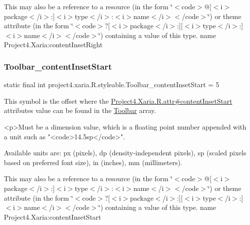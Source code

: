 This may also be a reference to a resource (in the form \char`\"{}$<$code$>$@\mbox{[}$<$i$>$package$<$/i$>$\+:\mbox{]}$<$i$>$type$<$/i$>$\+:$<$i$>$name$<$/i$>$$<$/code$>$\char`\"{}) or theme attribute (in the form \char`\"{}$<$code$>$?\mbox{[}$<$i$>$package$<$/i$>$\+:\mbox{]}\mbox{[}$<$i$>$type$<$/i$>$\+:\mbox{]}$<$i$>$name$<$/i$>$$<$/code$>$\char`\"{}) containing a value of this type.  name Project4.\+Xaria\+:content\+Inset\+Right \mbox{\label{classproject4_1_1xaria_1_1R_1_1styleable_a9834196c2626e358f21cf55efd25f27c}} 
\subsubsection{\texorpdfstring{Toolbar\+\_\+content\+Inset\+Start}{Toolbar\_contentInsetStart}}
{\footnotesize\ttfamily static final int project4.\+xaria.\+R.\+styleable.\+Toolbar\+\_\+content\+Inset\+Start = 5\hspace{0.3cm}{\ttfamily [static]}}

This symbol is the offset where the \hyperlink{}{Project4.\+Xaria.\+R.\+attr\#content\+Inset\+Start} attribute\textquotesingle{}s value can be found in the \hyperlink{classproject4_1_1xaria_1_1R_1_1styleable_af6c30f9e9e086f6bf4e510669443fa59}{Toolbar} array.

\begin{DoxyVerb}      <p>Must be a dimension value, which is a floating point number appended with a unit such as "<code>14.5sp</code>".
\end{DoxyVerb}
 Available units are\+: px (pixels), dp (density-\/independent pixels), sp (scaled pixels based on preferred font size), in (inches), mm (millimeters). 

This may also be a reference to a resource (in the form \char`\"{}$<$code$>$@\mbox{[}$<$i$>$package$<$/i$>$\+:\mbox{]}$<$i$>$type$<$/i$>$\+:$<$i$>$name$<$/i$>$$<$/code$>$\char`\"{}) or theme attribute (in the form \char`\"{}$<$code$>$?\mbox{[}$<$i$>$package$<$/i$>$\+:\mbox{]}\mbox{[}$<$i$>$type$<$/i$>$\+:\mbox{]}$<$i$>$name$<$/i$>$$<$/code$>$\char`\"{}) containing a value of this type.  name Project4.\+Xaria\+:content\+Inset\+Start \mbox{\label{classproject4_1_1xaria_1_1R_1_1styleable_a56c0b377a7daf8828ad9a239006baaaf}} 
